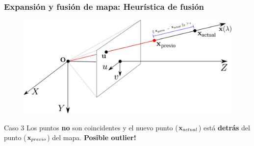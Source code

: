 \documentclass[compress]{beamer}
\begin{document}
\begin{frame}
	\frametitle{Expansión y fusión de mapa: Heurística de fusión}
	\begin{figure}[htb]
		\centering
		\includegraphics[width=\columnwidth]{./method/metodo-fusion-spa-caso-2.pdf}
	\end{figure}
	\begin{block}{Caso 3}
		Los puntos \textbf{no} son coincidentes y el nuevo punto ($\boldsymbol{\mathbf{x}}_{actual}$) está \textbf{detrás} del punto ($\boldsymbol{\mathbf{x}}_{previo}$) del mapa.  \textbf{Posible outlier!}
	\end{block}
\end{frame}
\end{document}
